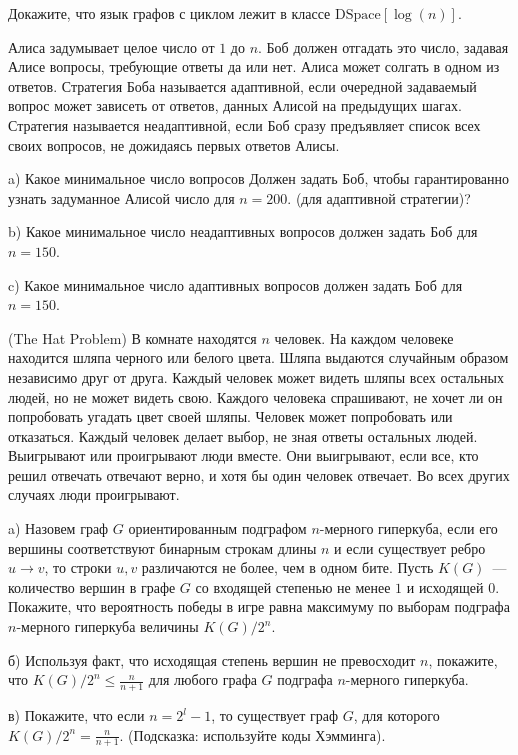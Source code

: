 \begin{ptask}{43}
    Докажите, что язык графов с циклом лежит в классе $\mathrm{DSpace}[\log(n)]$.
\end{ptask}

\begin{ptask}{51}
	Алиса задумывает целое число от $1$ до $n$. Боб должен отгадать это число,
    задавая Алисе вопросы, требующие ответы да или нет. Алиса может солгать в одном
    из ответов. Стратегия Боба называется адаптивной, если очередной задаваемый
    вопрос может зависеть от ответов, данных Алисой на предыдущих шагах. Стратегия
    называется неадаптивной, если Боб сразу предъявляет список всех своих вопросов,
    не дожидаясь первых ответов Алисы.

	a) Какое минимальное число вопросов Должен задать Боб, чтобы гарантированно
    узнать задуманное Алисой число для $n = 200$. (для адаптивной стратегии)?
    
	b) Какое минимальное число неадаптивных вопросов должен задать Боб для $n = 150$.
    
	c) Какое минимальное число адаптивных вопросов должен задать Боб для $n = 150$.
\end{ptask}

\begin{ptask}{52} (The Hat Problem)
    В комнате находятся $n$ человек. На каждом человеке находится шляпа черного или
    белого цвета. Шляпа выдаются случайным образом независимо друг от друга. Каждый
    человек может видеть шляпы всех остальных людей, но не может видеть свою. Каждого
    человека спрашивают, не хочет ли он попробовать угадать цвет своей шляпы. Человек
    может попробовать или отказаться. Каждый человек делает выбор, не зная ответы
    остальных людей. Выигрывают или проигрывают люди вместе. Они выигрывают, если
    все, кто решил отвечать отвечают верно, и хотя бы один человек отвечает. Во всех
    других случаях люди проигрывают.

	a) Назовем граф $G$ ориентированным подграфом $n$-мерного гиперкуба, если его
    вершины соответствуют бинарным строкам длины $n$ и если существует ребро $u
    \rightarrow v$, то строки $u, v$ различаются не более, чем в одном бите. Пусть
    $K(G)$~--- количество вершин в графе $G$ со входящей степенью не менее $1$ и
    исходящей $0$. Покажите, что вероятность победы в игре равна максимуму по выборам
    подграфа $n$-мерного гиперкуба величины $K(G) / 2^n$.

    б) Используя факт, что исходящая степень вершин не превосходит $n$, покажите, что
    $K(G) / 2^n \le \frac{n}{n + 1}$ для любого графа $G$ подграфа $n$-мерного
    гиперкуба.

    в) Покажите, что если $n = 2^l - 1$, то существует граф $G$, для которого
	$K(G) / 2^n = \frac{n}{n + 1}$. (Подсказка: используйте коды Хэмминга).
\end{ptask}

